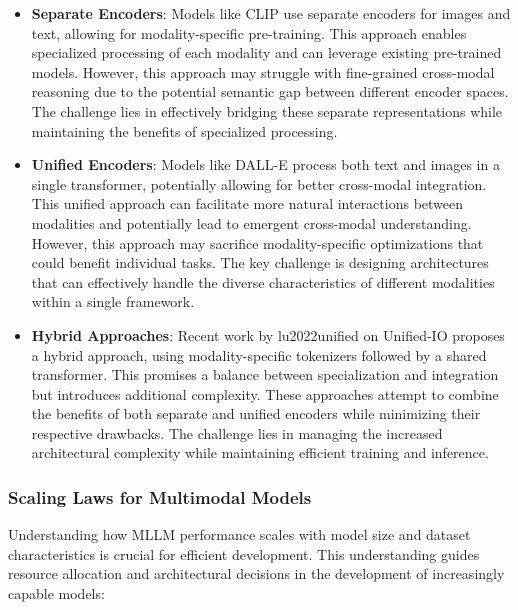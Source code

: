 \begin{itemize}
    \item \textbf{Separate Encoders}: Models like CLIP \citep{radford2021learning} use separate encoders for images and text, allowing for modality-specific pre-training. This approach enables specialized processing of each modality and can leverage existing pre-trained models. However, this approach may struggle with fine-grained cross-modal reasoning due to the potential semantic gap between different encoder spaces. The challenge lies in effectively bridging these separate representations while maintaining the benefits of specialized processing.
    
    \item \textbf{Unified Encoders}: Models like DALL-E \citep{ramesh2021zero} process both text and images in a single transformer, potentially allowing for better cross-modal integration. This unified approach can facilitate more natural interactions between modalities and potentially lead to emergent cross-modal understanding. However, this approach may sacrifice modality-specific optimizations that could benefit individual tasks. The key challenge is designing architectures that can effectively handle the diverse characteristics of different modalities within a single framework.
    
    \item \textbf{Hybrid Approaches}: Recent work by lu2022unified  on Unified-IO proposes a hybrid approach, using modality-specific tokenizers followed by a shared transformer. This promises a balance between specialization and integration but introduces additional complexity. These approaches attempt to combine the benefits of both separate and unified encoders while minimizing their respective drawbacks. The challenge lies in managing the increased architectural complexity while maintaining efficient training and inference.

\end{itemize}

\subsubsection{Scaling Laws for Multimodal Models}
Understanding how MLLM performance scales with model size and dataset characteristics is crucial for efficient development. This understanding guides resource allocation and architectural decisions in the development of increasingly capable models:

